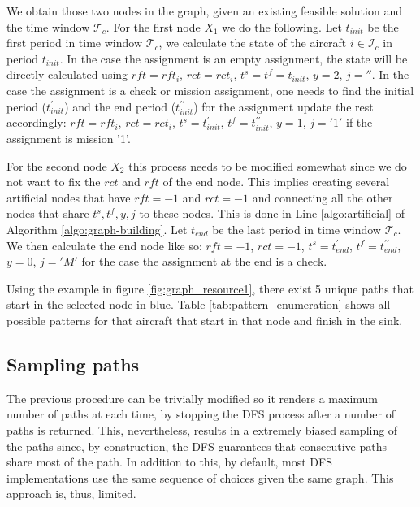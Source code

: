 \documentclass[a4paper,11pt]{article}
\begin{document}
    We obtain those two nodes in the graph, given an existing feasible solution and the time window $\mathcal{T}_{c}$.
    For the first node $X_1$ we do the following. Let $t_{init}$ be the first period in time window $\mathcal{T}_{c}$, we calculate the state of the aircraft $i \in \mathcal{I}_{c}$ in period $t_{init}$. In the case the assignment is an empty assignment, the state will be directly calculated using $rft=rft_i$, $rct=rct_i$, $t^s=t^f=t_{init}$, $y=2$, $j=''$. In the case the assignment is a check or mission assignment, one needs to find the initial period ($t^\prime_{init}$) and the end period ($t^{\prime\prime}_{init}$) for the assignment update the rest accordingly: $rft=rft_i$, $rct=rct_i$, $t^s=t^\prime_{init}$, $t^f=t^{\prime\prime}_{init}$, $y=1$, $j='1'$ if the assignment is mission '1'.

    For the second node $X_2$ this process needs to be modified somewhat since we do not want to fix the $rct$ and $rft$ of the end node. This implies creating several artificial nodes that have $rft=-1$ and $rct=-1$ and connecting all the other nodes that share $t^s, t^f, y, j$ to these nodes. This is done in Line \ref{algo:artificial} of Algorithm \ref{algo:graph-building}. Let $t_{end}$ be the last period in time window $\mathcal{T}_{c}$. We then calculate the end node like so: $rft=-1$, $rct=-1$, $t^s=t^\prime_{end}$, $t^f=t^{\prime\prime}_{end}$, $y=0$, $j='M'$ for the case the assignment at the end is a check.

    Using the example in figure \ref{fig:graph_resource1}, there exist 5 unique paths that start in the selected node in blue. Table \ref{tab:pattern_enumeration} shows all possible patterns for that aircraft that start in that node and finish in the sink.

    

  \subsection{Sampling paths}

    The previous procedure can be trivially modified so it renders a maximum number of paths at each time, by stopping the DFS process after a number of paths is returned. This, nevertheless, results in a extremely biased sampling of the paths since, by construction, the DFS guarantees that consecutive paths share most of the path. In addition to this, by default, most DFS implementations use the same sequence of choices given the same graph. This approach is, thus, limited.
\end{document}
